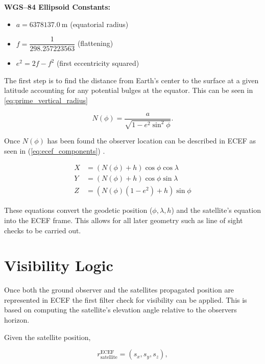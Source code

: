 \noindent\textbf{WGS--84 Ellipsoid Constants:}
\begin{itemize}
    \item $a = 6378137.0 \ \text{m}$ \quad (equatorial radius)
    \item $f = \dfrac{1}{298.257223563}$ \quad (flattening)
    \item $e^{2} = 2f - f^{2}$ \quad (first eccentricity squared)
\end{itemize}

 
The first step is to find the distance from Earth's center to the surface at a given latitude accounting for any potential bulges at the equator. This can be seen in \ref{eq:prime_vertical_radius} \cite{WGS84_ECEF_Conversion}

\begin{equation} \label{eq:prime_vertical_radius}
N(\phi) = \frac{a}{\sqrt{1 - e^{2}\sin^{2}\phi}}.
\end{equation}

Once $N(\phi)$ has been found the observer location can be described in ECEF as seen in (\ref{eq:ecef_components}) \cite{WGS84_ECEF_Conversion}.


\begin{align} \label{eq:ecef_components}
X &= \left( N(\phi) + h \right)\cos\phi\cos\lambda \\[6pt]
Y &= \left( N(\phi) + h \right)\cos\phi\sin\lambda \\[6pt]
Z &= \left( N(\phi)(1 - e^{2}) + h \right)\sin\phi
\end{align}

These equations convert the geodetic position ($\phi, \lambda, h$) and the satellite's equation into the ECEF frame. This allows for all later geometry such as line of sight checks to be carried out. 

\section{Visibility Logic}
Once both the ground observer and the satellites propagated position are represented in ECEF the first filter check for visibility can be applied. This is based on computing the satellite's elevation angle relative to the observers horizon. 

Given the satellite position,

\begin{equation}
     r_{\text{satellite}}^{\text{ECEF}} = (s_x, s_y, s_z),
\end{equation}


